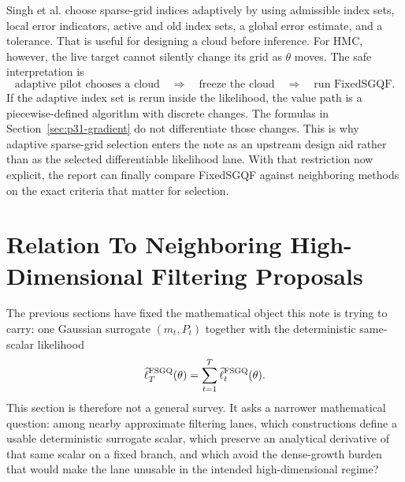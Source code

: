 \documentclass[11pt]{article}
\numberwithin{equation}{section}
\newcommand{\ellhat}{\widehat\ell}
\begin{document}
Singh et al. \cite{singh2018adaptive} choose sparse-grid indices adaptively by
using admissible index sets, local error indicators, active and old index
sets, a global error estimate, and a tolerance.  That is useful for designing a
cloud before inference.  For HMC, however, the live target cannot silently
change its grid as \(\theta\) moves.  The safe interpretation is
\begin{equation}
  \text{adaptive pilot chooses a cloud}
  \quad\Longrightarrow\quad
  \text{freeze the cloud}
  \quad\Longrightarrow\quad
  \text{run FixedSGQF}.
  \label{eq:p31-adaptive-to-fixed}
\end{equation}
If the adaptive index set is rerun inside the likelihood, the value path is a
piecewise-defined algorithm with discrete changes.  The formulas in
Section~\ref{sec:p31-gradient} do not differentiate those changes.  This is why
adaptive sparse-grid selection enters the note as an upstream design aid rather
than as the selected differentiable likelihood lane.  With that restriction now
explicit, the report can finally compare FixedSGQF against neighboring methods on
the exact criteria that matter for selection.

\section{Relation To Neighboring High-Dimensional Filtering Proposals}
\label{sec:p31-comparison}

The previous sections have fixed the mathematical object this note is trying to
carry: one Gaussian surrogate \((m_t,P_t)\) together with the deterministic
same-scalar likelihood
\begin{equation}
  \ellhat_T^{\rm FSGQ}(\theta)
  =
  \sum_{t=1}^T \ellhat_t^{\rm FSGQ}(\theta).
  \label{eq:p32-selection-fixedsgqf-scalar}
\end{equation}
This section is therefore not a general survey.  It asks a narrower mathematical
question: among nearby approximate filtering lanes, which constructions define a
usable deterministic surrogate scalar, which preserve an analytical derivative
of that same scalar on a fixed branch, and which avoid the dense-growth burden
that would make the lane unusable in the intended high-dimensional regime?
\end{document}
